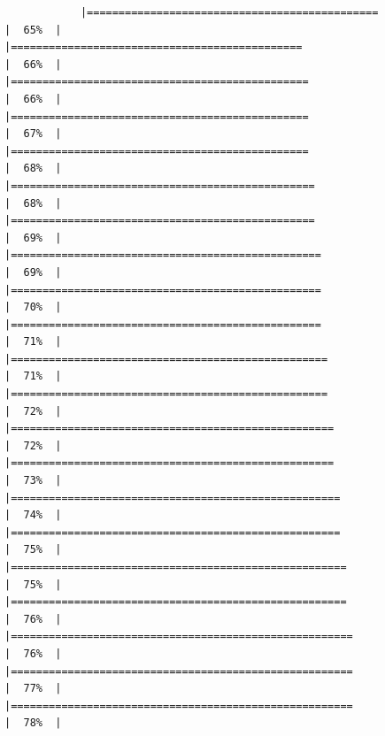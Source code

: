 \documentclass[
]{article}
\begin{document}
\begin{verbatim}
            |==============================================                        |  65%  |                                                                              |==============================================                        |  66%  |                                                                              |===============================================                       |  66%  |                                                                              |===============================================                       |  67%  |                                                                              |===============================================                       |  68%  |                                                                              |================================================                      |  68%  |                                                                              |================================================                      |  69%  |                                                                              |=================================================                     |  69%  |                                                                              |=================================================                     |  70%  |                                                                              |=================================================                     |  71%  |                                                                              |==================================================                    |  71%  |                                                                              |==================================================                    |  72%  |                                                                              |===================================================                   |  72%  |                                                                              |===================================================                   |  73%  |                                                                              |====================================================                  |  74%  |                                                                              |====================================================                  |  75%  |                                                                              |=====================================================                 |  75%  |                                                                              |=====================================================                 |  76%  |                                                                              |======================================================                |  76%  |                                                                              |======================================================                |  77%  |                                                                              |======================================================                |  78%  |                                                                   
\end{verbatim}
\end{document}
